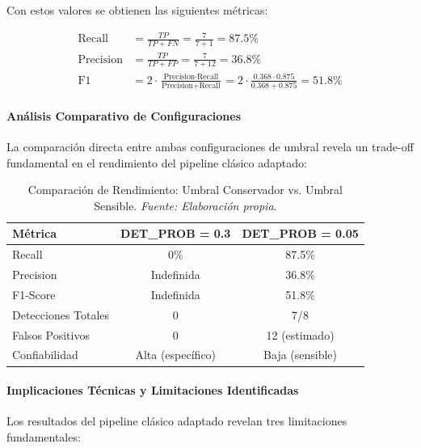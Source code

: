 Con estos valores se obtienen las siguientes métricas:

\begin{align}
\text{Recall} &= \frac{TP}{TP + FN} = \frac{7}{7 + 1} = 87.5\% \\
\text{Precision} &= \frac{TP}{TP + FP} = \frac{7}{7 + 12} = 36.8\% \\
\text{F1} &= 2 \cdot \frac{\text{Precision} \cdot \text{Recall}}{\text{Precision} + \text{Recall}} = 2 \cdot \frac{0.368 \cdot 0.875}{0.368 + 0.875} = 51.8\%
\end{align}

\paragraph{Análisis Comparativo de Configuraciones}

La comparación directa entre ambas configuraciones de umbral revela un trade-off fundamental en el rendimiento del pipeline clásico adaptado:

\begin{table}[H]
    \centering
    \caption{Comparación de Rendimiento: Umbral Conservador vs. Umbral Sensible. \textit{Fuente: Elaboración propia}.}
    \label{tab:comparacion_umbrales_linea1}
    \begin{tabular}{|l|c|c|}
        \hline
        \textbf{Métrica} & \textbf{DET\_PROB = 0.3} & \textbf{DET\_PROB = 0.05} \\
        \hline
        Recall & 0\% & 87.5\% \\
        \hline
        Precision & Indefinida & 36.8\% \\
        \hline
        F1-Score & Indefinida & 51.8\% \\
        \hline
        Detecciones Totales & 0 & 7/8 \\
        \hline
        Falsos Positivos & 0 & 12 (estimado) \\
        \hline
        Confiabilidad & Alta (específico) & Baja (sensible) \\
        \hline
    \end{tabular}
\end{table}

\paragraph{Implicaciones Técnicas y Limitaciones Identificadas}

Los resultados del pipeline clásico adaptado revelan tres limitaciones fundamentales:

